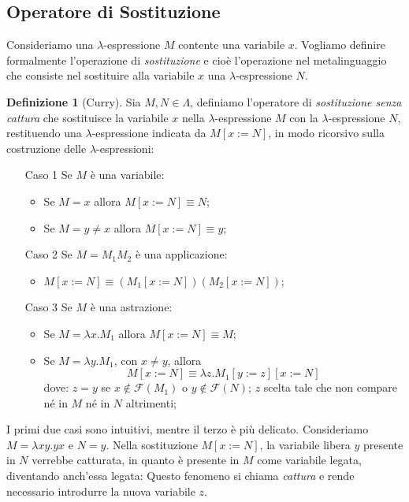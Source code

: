 \documentclass[a4paper,11pt]{article}
\theoremstyle{definition}
\newtheorem{defn}{Definizione}
\newcommand{\FF}{\mathcal{F}}
\begin{document}
\subsection{Operatore di Sostituzione}
Consideriamo una $\lambda$-espressione $M$ contente una variabile $x$.
Vogliamo definire formalmente l'operazione di \textit{sostituzione} e cioè l'operazione 
nel metalinguaggio che consiste nel sostituire alla variabile $x$ 
una $\lambda$-espressione $N$.

\begin{defn}[Curry]
  Sia $M,N\in\Lambda$, definiamo l'operatore di \textit{sostituzione senza
  cattura} che sostituisce la variabile $x$ nella $\lambda$-espressione $M$ con la
  $\lambda$-espressione $N$, restituendo una $\lambda$-espressione indicata da
  $M[x:=N]$, in modo ricorsivo sulla costruzione delle $\lambda$-espressioni:
  \begin{itemize}
    \item[{Caso 1}] Se $M$ è una variabile:
      \begin{itemize}
        \item Se $M=x$ allora $M[x:=N]\equiv N$;
        \item Se $M=y\ne x$ allora $M[x:=N]\equiv y$;
      \end{itemize}
    \item[Caso 2] Se $M=M_1M_2$ è una applicazione:
      \begin{itemize}
        \item $M[x:=N]\equiv (M_1[x:=N])(M_2[x:=N])$; 
      \end{itemize}
    \item[Caso 3] Se $M$ è una astrazione:
      \begin{itemize}
        \item Se $M=\lambda x.M_1$ allora $M[x:=N] \equiv M$;
        \item Se $M =\lambda y.M_1$, con $x\ne y$, allora 
          \[
            M[x:=N] \equiv\lambda z.M_1[y:=z][x:=N]
          \]
          dove: $z=y$ se $x\not\in\FF(M_1)$ o
          $y\not\in \FF(N)$; $z$ scelta tale che non compare né in $M$ né in
          $N$ altrimenti;
      \end{itemize}
  \end{itemize}
\end{defn}
I primi due casi sono intuitivi, mentre il terzo è più delicato. Consideriamo
$M=\lambda xy.yx$ e $N=y$. Nella sostituzione $M[x:=N]$, la variabile libera 
$y$ presente in $N$ verrebbe catturata, in quanto è presente in $M$ come variabile legata, 
diventando anch'essa legata: Questo fenomeno si chiama \textit{cattura} e rende
necessario introdurre la nuova variabile $z$.
\end{document}
